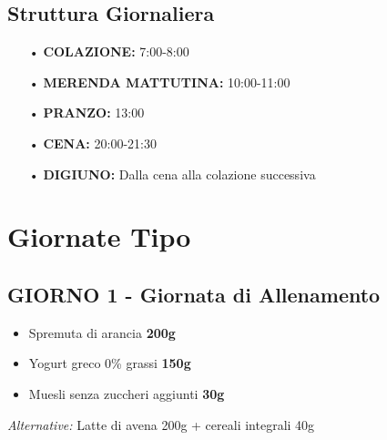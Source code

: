 \documentclass[11pt,a4paper]{article}
\begin{document}
\begin{center}
\end{center}

\subsection{Struttura Giornaliera}
\begin{itemize}[leftmargin=*]
\item[\textcolor{maincolor}{•}] \textbf{COLAZIONE:} 7:00-8:00
\item[\textcolor{maincolor}{•}] \textbf{MERENDA MATTUTINA:} 10:00-11:00
\item[\textcolor{maincolor}{•}] \textbf{PRANZO:} 13:00
\item[\textcolor{maincolor}{•}] \textbf{CENA:} 20:00-21:30
\item[\textcolor{maincolor}{•}] \textbf{DIGIUNO:} Dalla cena alla colazione successiva
\end{itemize}

\newpage

\section{Giornate Tipo}

\subsection{GIORNO 1 - Giornata di Allenamento}

\begin{tcolorbox}[colback=lightgray,colframe=accentcolor,boxrule=1pt,arc=3pt,title=\textbf{COLAZIONE (7:00-8:00)}]
\begin{itemize}[leftmargin=*,itemsep=0pt]
\item Spremuta di arancia \textbf{200g}
\item Yogurt greco 0\% grassi \textbf{150g}
\item Muesli senza zuccheri aggiunti \textbf{30g}
\end{itemize}

\textit{Alternative:} Latte di avena 200g + cereali integrali 40g
\end{tcolorbox}
\end{document}
